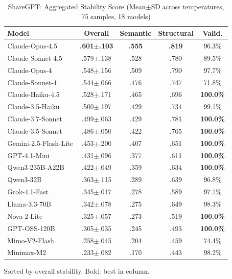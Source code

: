 \documentclass{article}
\theoremstyle{plain}
\theoremstyle{definition}
\begin{document}
\begin{table}[h]
\centering
\caption{ShareGPT: Aggregated Stability Score (Mean$\pm$SD across temperatures, 75 samples, 18 models)}
\label{tab:consistency-summary}
\scriptsize
\begin{tabular}{@{}lcccc@{}}
\toprule
\textbf{Model} & \textbf{Overall} & \textbf{Semantic} & \textbf{Structural} & \textbf{Valid.} \\
\midrule
Claude-Opus-4.5 & \textbf{.601$\pm$.103} & \textbf{.555} & \textbf{.819} & 96.3\% \\
Claude-Sonnet-4.5 & .579$\pm$.138 & .528 & .780 & 89.5\% \\
Claude-Opus-4 & .548$\pm$.156 & .509 & .790 & 97.7\% \\
Claude-Sonnet-4 & .544$\pm$.066 & .476 & .747 & 71.8\% \\
Claude-Haiku-4.5 & .528$\pm$.171 & .465 & .696 & \textbf{100.0\%} \\
Claude-3.5-Haiku & .500$\pm$.197 & .429 & .734 & 99.1\% \\
Claude-3.7-Sonnet & .499$\pm$.063 & .429 & .781 & \textbf{100.0\%} \\
Claude-3.5-Sonnet & .486$\pm$.050 & .422 & .765 & \textbf{100.0\%} \\
Gemini-2.5-Flash-Lite & .453$\pm$.200 & .407 & .651 & \textbf{100.0\%} \\
GPT-4.1-Mini & .431$\pm$.096 & .377 & .611 & \textbf{100.0\%} \\
Qwen3-235B-A22B & .422$\pm$.049 & .359 & .634 & \textbf{100.0\%} \\
Qwen3-32B & .363$\pm$.115 & .289 & .639 & 96.8\% \\
Grok-4.1-Fast & .345$\pm$.017 & .278 & .589 & 97.1\% \\
Llama-3.3-70B & .342$\pm$.078 & .275 & .649 & 98.3\% \\
Nova-2-Lite & .325$\pm$.057 & .273 & .519 & \textbf{100.0\%} \\
GPT-OSS-120B & .305$\pm$.035 & .245 & .493 & \textbf{100.0\%} \\
Mimo-V2-Flash & .258$\pm$.045 & .204 & .459 & 74.4\% \\
Minimax-M2 & .233$\pm$.082 & .170 & .443 & 98.2\% \\
\bottomrule
\end{tabular}

\vspace{0.3em}
\raggedright\small Sorted by overall stability. Bold: best in column.
\end{table}
\end{document}
